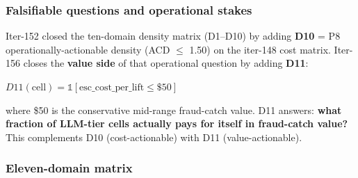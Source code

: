 
\subsubsection{Falsifiable questions and operational stakes}
Iter-152 closed the ten-domain density matrix (D1--D10) by adding
\textbf{D10} = P8 operationally-actionable density
(ACD $\leq$ 1.50) on the iter-148 cost matrix.  Iter-156 closes the
\textbf{value side} of that operational question by adding \textbf{D11}:

  $D11(\text{cell}) = \mathbb{1}[\text{esc\_cost\_per\_lift} \leq \$50]$

where \$50 is the conservative mid-range fraud-catch value.  D11
answers: \textbf{what fraction of LLM-tier cells actually pays for
itself in fraud-catch value?}  This complements D10 (cost-actionable)
with D11 (value-actionable).

\subsubsection{Eleven-domain matrix}


